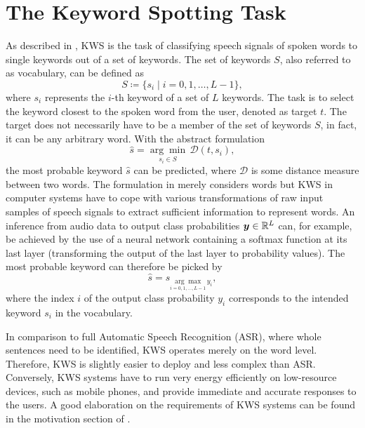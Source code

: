 
\section{The Keyword Spotting Task}\label{sec:intro_kws}
As described in , KWS is the task of classifying speech signals of spoken words to single keywords out of a set of keywords.
The set of keywords $S$, also referred to as vocabulary, can be defined as
\begin{equation}\label{eq:intro_kws_dict}
	S \coloneqq \{s_i \mid i = 0, 1, \dots, L - 1\},
\end{equation}
where $s_i$ represents the $i$-th keyword of a set of $L$ keywords.
The task is to select the keyword closest to the spoken word from the user, denoted as target $t$.
The target does not necessarily have to be a member of the set of keywords $S$, in fact, it can be any arbitrary word.
With the abstract formulation
\begin{equation}\label{eq:intro_kws_task}
	\hat{s} = \underset{s_i \in S}{\arg \min} \, \mathcal{D}(t, s_i),
\end{equation}
the most probable keyword $\hat{s}$ can be predicted, where $\mathcal{D}$ is some distance measure between two words.
The formulation in  merely considers words but KWS in computer systems have to cope with various transformations of raw input samples of speech signals to extract sufficient information to represent words.
An inference from audio data to output class probabilities $\bm{y} \in \mathbb{R}^L$ can, for example, be achieved by the use of a neural network containing a softmax function at its last layer (transforming the output of the last layer to probability values).
The most probable keyword can therefore be picked by
\begin{equation}\label{eq:intro_kws_class}
	\hat{s} = s_{\underset{i = 0, 1, \dots, L - 1}{\arg \max} \, y_i},
\end{equation}
where the index $i$ of the output class probability $y_i$ corresponds to the intended keyword $s_i$ in the vocabulary.

In comparison to full Automatic Speech Recognition (ASR), where whole sentences need to be identified, KWS operates merely on the word level.
Therefore, KWS is slightly easier to deploy and less complex than ASR.
Conversely, KWS systems have to run very energy efficiently on low-resource devices, such as mobile phones, and provide immediate and accurate responses to the users.
A good elaboration on the requirements of KWS systems can be found in the motivation section of \cite{Warden2018}.